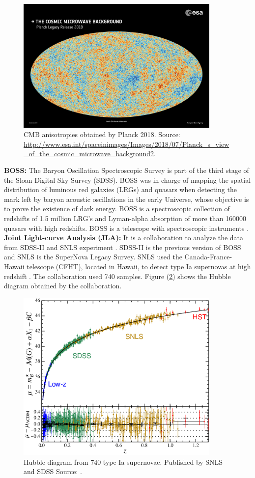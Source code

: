 \documentclass[onecolumn,           %
               showpacs,            %
               preprintnumbers,     %
               aps,                 %
               prl,          	    %
               letterpaper,             %
               superscriptaddress,      %
               nofootinbib,         %
               tightenlines,        %
               floats,floatfix      %
               ,usenatbib,
               ]{revtex4-1}
\begin{document}
\begin{figure}[h]
	\centering
	\includegraphics[width=10cm]{FiguresCosmo/CMB.jpg}	
	\caption{CMB anisotropies obtained by Planck 2018. Source: \url{http://www.esa.int/spaceinimages/Images/2018/07/Planck_s_view_of_the_cosmic_microwave_background2}.}
	\label{CMBPlanck}
\end{figure}

\textbf{BOSS:} The Baryon Oscillation Spectroscopic Survey is part of the third stage of the Sloan Digital Sky Survey (SDSS). BOSS was in charge of mapping the spatial distribution of luminous red galaxies (LRGs) and quasars when detecting the mark left by baryon acoustic oscillations in the early Universe, whose objective is to prove the existence of dark energy. BOSS is a spectroscopic collection of redshifts of 1.5 million LRG's and Lyman-alpha absorption of more than 160000 quasars with high redshifts. BOSS is a telescope with spectroscopic instruments \cite{boss}.\\

\textbf{Joint Light-curve Analysis (JLA):} It is a collaboration to analyze the data from SDSS-II and SNLS experiment \cite{jla}. SDSS-II is the previous version of BOSS and SNLS is the SuperNova Legacy Survey. SNLS used the Canada-France-Hawaii telescope (CFHT), located in Hawaii, to detect type Ia supernovas at high redshift \cite{snls}. The collaboration used 740 samples. Figure (\ref{jla}) shows the Hubble diagram obtained by the collaboration.

\begin{figure}[h]
	\centering
	\includegraphics[width=10cm]{FiguresCosmo/snls_fig2.png}	
	\caption{Hubble diagram from 740 type Ia supernovae. Published by SNLS and SDSS Source: \cite{snls}.}
	\label{jla}
\end{figure}
\end{document}
